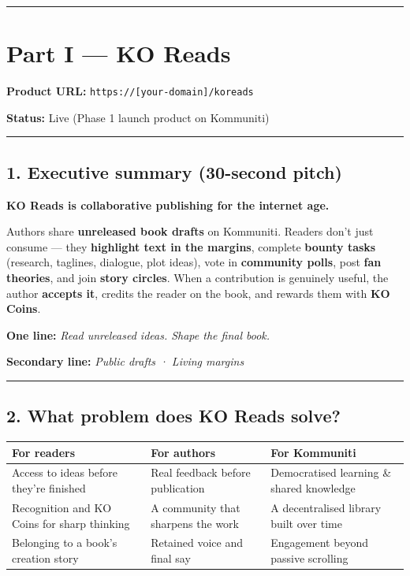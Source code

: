 \documentclass[11pt,a4paper]{report}
\begin{document}
\medskip\hrule\medskip

\section{Part I --- KO Reads}

\textbf{Product URL:} \texttt{https://[your-domain]/koreads}

\textbf{Status:} Live (Phase 1 launch product on Kommuniti)


\medskip\hrule\medskip

\subsection{1. Executive summary (30-second pitch)}

\textbf{KO Reads is collaborative publishing for the internet age.}


Authors share \textbf{unreleased book drafts} on Kommuniti. Readers don’t just consume --- they \textbf{highlight text in the margins}, complete \textbf{bounty tasks} (research, taglines, dialogue, plot ideas), vote in \textbf{community polls}, post \textbf{fan theories}, and join \textbf{story circles}. When a contribution is genuinely useful, the author \textbf{accepts it}, credits the reader on the book, and rewards them with \textbf{KO Coins}.


\textbf{One line:} \textit{Read unreleased ideas. Shape the final book.}


\textbf{Secondary line:} \textit{Public drafts · Living margins}


\medskip\hrule\medskip

\subsection{2. What problem does KO Reads solve?}

\begin{longtable}{|l|l|l|}
\hline
For readers & For authors & For Kommuniti \\ \hline
Access to ideas before they’re finished & Real feedback before publication & Democratised learning \& shared knowledge \\ \hline
Recognition and KO Coins for sharp thinking & A community that sharpens the work & A decentralised library built over time \\ \hline
Belonging to a book’s creation story & Retained voice and final say & Engagement beyond passive scrolling \\
\hline
\end{longtable}
\end{document}
